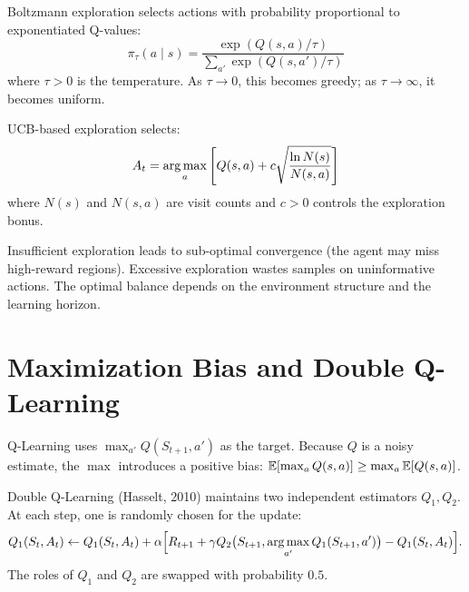 \begin{definition}
Boltzmann exploration selects actions with probability proportional to
exponentiated Q-values:
\[
    \pi_\tau(a \mid s) = \frac{\exp(Q(s,a) / \tau)}{\sum_{a'} \exp(Q(s,a') / \tau)}
\]
where $\tau > 0$ is the temperature. As $\tau \to 0$, this becomes greedy;
as $\tau \to \infty$, it becomes uniform.
\end{definition}

\begin{definition}
UCB-based exploration selects:
\[
    A_t = \operatorname*{arg\,max}_a \left[ Q(s,a) + c \sqrt{\frac{\ln N(s)}{N(s,a)}} \right]
\]
where $N(s)$ and $N(s,a)$ are visit counts and $c > 0$ controls the
exploration bonus.
\end{definition}

\begin{attention}[title=\textbf{Exploration-Exploitation Dilemma}]
Insufficient exploration leads to sub-optimal convergence (the agent may
miss high-reward regions). Excessive exploration wastes samples on
uninformative actions. The optimal balance depends on the environment
structure and the learning horizon.
\end{attention}

\section{Maximization Bias and Double Q-Learning}
\label{sec:double_q}

\begin{definition}
Q-Learning uses $\max_{a'} Q(S_{t+1}, a')$ as the target. Because $Q$
is a noisy estimate, the $\max$ introduces a positive bias:
$\mathbb{E}[\max_a Q(s,a)] \geq \max_a \mathbb{E}[Q(s,a)]$.
\end{definition}

\begin{definition}
Double Q-Learning (Hasselt, 2010) maintains two independent estimators
$Q_1, Q_2$. At each step, one is randomly chosen for the update:
\[
    Q_1(S_t, A_t) \leftarrow Q_1(S_t, A_t) + \alpha \Big[
    R_{t+1} + \gamma Q_2\big(S_{t+1}, \operatorname*{arg\,max}_{a'} Q_1(S_{t+1}, a')\big) - Q_1(S_t, A_t)
    \Big].
\]
The roles of $Q_1$ and $Q_2$ are swapped with probability $0.5$.
\end{definition}

